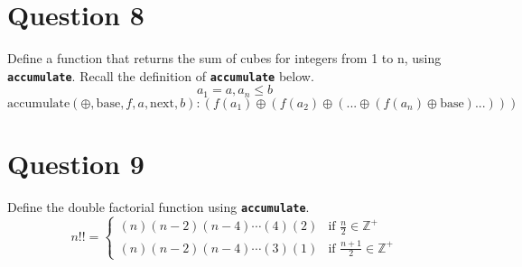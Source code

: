\section{Question 8}
Define a function that returns the sum of cubes for integers from 1 to n, using \texttt{\bfseries accumulate}.
Recall the definition of \texttt{\bfseries accumulate} below.
\[a_1 = a, a_n \le b\]
\[\text{accumulate}(\oplus, \text{base}, f, a, \text{next}, b): (f(a_1) \oplus (f(a_2) \oplus (... \oplus (f(a_n) \oplus \text{base})...)))\]

\section{Question 9}
Define the double factorial function using \texttt{\bfseries accumulate}.
\[
    n!! =
    \begin{cases}
        (n)(n-2)(n-4)\cdots(4)(2) & \text{if } \frac{n}{2} \in \mathbb{Z^+} \\
        (n)(n-2)(n-4)\cdots(3)(1) & \text{if } \frac{n+1}{2} \in \mathbb{Z^+}
    \end{cases}    
\]
